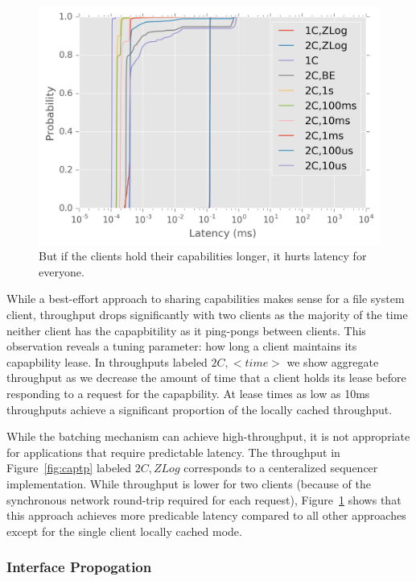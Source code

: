 \documentclass[10pt,twocolumn]{article}
\begin{document}
\begin{figure}[h]
\centering
\includegraphics{figures/caps-delay-latency.png}
\caption{But if the clients hold their capabilities longer, it hurts
latency for everyone.}
\label{fig:capcdf}
\end{figure}

While a best-effort approach to sharing capabilities makes sense for a file
system client, throughput drops significantly with two clients as the majority
of the time neither client has the capapbitility as it ping-pongs between
clients. This observation reveals a tuning parameter: how long a client
maintains its capapbility lease. In throughputs labeled $2C,<time>$ we show
aggregate throughput as we decrease the amount of time that a client holds its
lease before responding to a request for the capapbility.  At lease times as
low as 10ms throughputs achieve a significant proportion of the locally cached
throughput.

While the batching mechanism can achieve high-throughput, it is not appropriate
for applications that require predictable latency. The throughput in
Figure~\ref{fig:captp} labeled $2C,ZLog$ corresponds to a centeralized
sequencer implementation. While throughput is lower for two clients (because of
the synchronous network round-trip required for each request),
Figure~\ref{fig:capcdf} shows that this approach achieves more predicable
latency compared to all other approaches except for the single client locally
cached mode.

\subsubsection{Interface Propogation}
\end{document}
